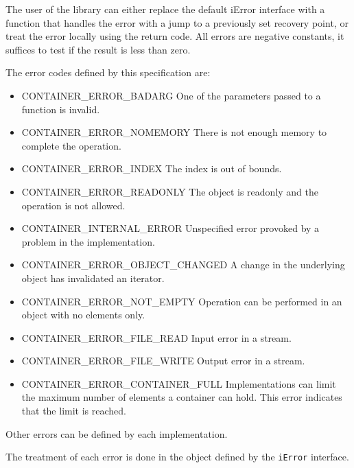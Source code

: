 \documentclass[12pt,a4paper]{memoir} %
\newcommand{\doerror}[1]{%
\par\noindent
{\footnotesize CONTAINER\_ERROR\_#1}
}
\begin{document}
The user of the library can either replace the default iError interface with a function that handles the error with a jump to a previously set recovery point, or treat the error locally using the return code. All errors are negative constants, it suffices to test if the result is less than zero.
 
The error codes defined by this specification are:
\begin{itemize}
\item
\doerror{BADARG} One of the parameters passed to a function is invalid.
\item
\doerror{NOMEMORY} There is not enough memory to complete the operation.
\item
\doerror{INDEX} The index is out of bounds.
\item
\doerror{READONLY} The object is readonly and the operation is not allowed.
\item
\textsc{CONTAINER\_INTERNAL\_ERROR} Unspecified error provoked by a problem in the implementation.
\item
\doerror{OBJECT\_CHANGED} A change in the underlying object has invalidated an iterator.
\item
\doerror{NOT\_EMPTY} Operation can be performed in an object with no elements only.
\item
\doerror{FILE\_READ} Input error in a stream.
\item
\doerror{FILE\_WRITE} Output error in a stream.
\item
\doerror{CONTAINER\_FULL} Implementations can limit the maximum number of elements a container can hold. This error indicates that the limit is reached.
\end{itemize}

Other errors can be defined by each implementation.

The treatment of each error is done in the object defined by the \texttt{iError} interface.
\end{document}
